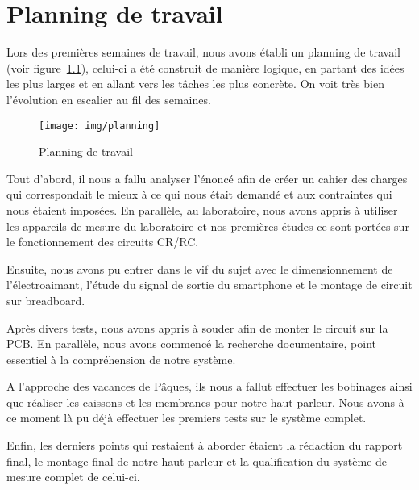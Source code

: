 \chapter{Planning de travail}

Lors des premières semaines de travail, nous avons établi un planning de travail (voir figure~\ref{fig:plan}), celui-ci a été construit de manière logique, en partant des idées les plus larges et en allant vers les tâches les plus concrète. On voit très bien l'évolution en escalier au fil des semaines.

\begin{figure}	
\begin{center}
\texttt{[image: img/planning]} 
\end{center}
\caption{Planning de travail}		
\label{fig:plan}		
\end{figure}

Tout d'abord, il nous a fallu analyser l'énoncé afin de créer un cahier des charges qui correspondait le mieux à ce qui nous était demandé et aux contraintes qui nous étaient imposées. 
En parallèle, au laboratoire, nous avons appris à utiliser les appareils de mesure du laboratoire et nos premières études ce sont portées sur le fonctionnement des circuits CR/RC.

Ensuite, nous avons pu entrer dans le vif du sujet avec le dimensionnement de l'électroaimant, l'étude du signal de sortie du smartphone et le montage de circuit sur breadboard.

Après divers tests, nous avons appris à souder afin de monter le circuit sur la PCB. En parallèle, nous avons commencé la recherche documentaire, point essentiel à la compréhension de notre système.

A l'approche des vacances de Pâques, ils nous a fallut effectuer les bobinages ainsi que réaliser les caissons et les membranes pour notre haut-parleur. Nous avons à ce moment là pu déjà effectuer les premiers tests sur le système complet.

Enfin, les derniers points qui restaient à aborder étaient la rédaction du rapport final, le montage final de notre haut-parleur et la qualification du système de mesure complet de celui-ci.

